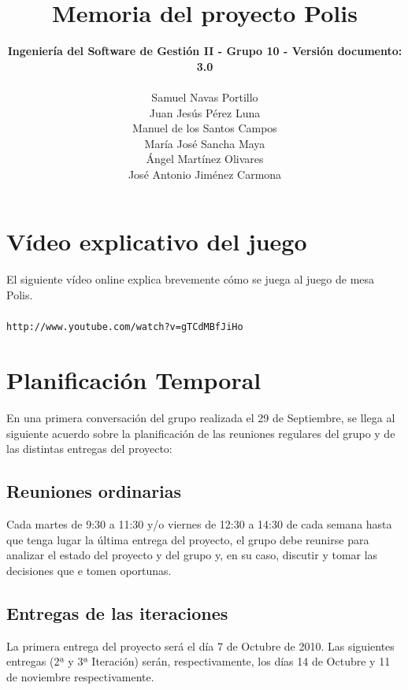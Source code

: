 \documentclass[11 pt]{book}
\begin{document}
\title{\textbf {\Huge Memoria del proyecto Polis}}
\author{
	\textbf {Ingeniería del Software de Gestión II - Grupo 10 - Versión documento: 3.0}\\\\
	Samuel Navas Portillo\\
	Juan Jesús Pérez Luna\\
	Manuel de los Santos Campos\\
	María José Sancha Maya\\
	Ángel Martínez Olivares\\
	José Antonio Jiménez Carmona}
\maketitle
\tableofcontents{}

\chapter{Vídeo explicativo del juego}
	El siguiente vídeo online explica brevemente cómo se juega al juego de mesa Polis.\\ \\
	\texttt{http://www.youtube.com/watch?v=gTCdMBfJiHo}
	
\chapter{Planificación Temporal}
	En una primera conversación del grupo realizada el 29 de Septiembre, se llega al siguiente acuerdo sobre la planificación de las reuniones regulares del grupo y de las distintas entregas del proyecto:\\

    \section*{Reuniones ordinarias}
	Cada martes de 9:30 a 11:30 y/o viernes de 12:30 a 14:30 de cada semana hasta que tenga lugar la última entrega del proyecto, el grupo debe reunirse para analizar el estado del proyecto y del grupo y, en su caso, discutir y tomar las decisiones que e tomen oportunas.\\

    \section*{Entregas de las iteraciones}
	La primera entrega del proyecto será el día 7 de Octubre de 2010. Las siguientes entregas (2ª y 3ª Iteración) serán, respectivamente, los días 14 de Octubre y 11 de noviembre respectivamente.
\end{document}
